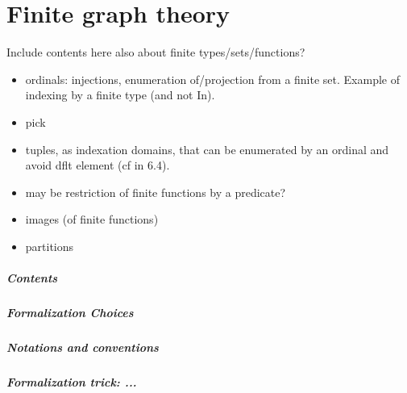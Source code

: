 \chapter{Finite graph theory}


Include contents here also about finite types/sets/functions?

\begin{itemize}
\item ordinals: injections, enumeration of/projection from a finite
  set. Example of indexing by a finite type (and not In).
\item pick
\item tuples, as indexation domains, that can be enumerated by an
  ordinal and avoid dflt element (cf  in
  6.4).
\item may be restriction of finite functions by a predicate?
\item images (of finite functions)
\item partitions
\end{itemize}
\paragraph{Contents}

\paragraph{Formalization Choices}

\paragraph{Notations and conventions}

\paragraph{Formalization trick: ...}
